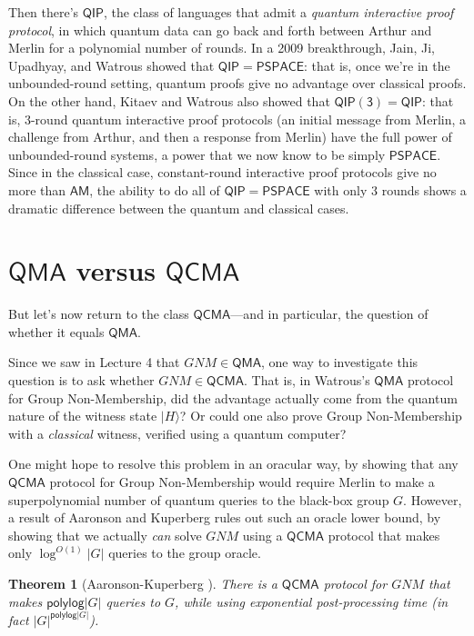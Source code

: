 \documentclass[12pt]{report}
\theoremstyle{plain}
\newtheorem{theorem}{Theorem}[section]
\theoremstyle{definition}
\renewcommand{\ket}[1]{|#1\rangle}
\begin{document}
Then there's $\mathsf{QIP}$, the class of languages that admit a {\em quantum interactive proof protocol}, in which quantum data can go back and forth between Arthur and Merlin for a polynomial number of rounds.  In a 2009 breakthrough, Jain, Ji, Upadhyay, and Watrous \cite{JJUW11} showed that $\mathsf{QIP}=\mathsf{PSPACE}$: that is, once we're in the unbounded-round setting, quantum proofs give no advantage over classical proofs.  On the other hand, Kitaev and Watrous \cite{kitaevwatrous} also showed that $\mathsf{QIP(3)}=\mathsf{QIP}$: that is, 3-round quantum interactive proof protocols (an initial message from Merlin, a challenge from Arthur, and then a response from Merlin) have the full power of unbounded-round systems, a power that we now know to be simply $\mathsf{PSPACE}$.  Since in the classical case, constant-round interactive proof protocols give no more than $\mathsf{AM}$, the ability to do all of $\mathsf{QIP}=\mathsf{PSPACE}$ with only $3$ rounds shows a dramatic difference between the quantum and classical cases.

\section{$\mathsf{QMA}$ versus $\mathsf{QCMA}$}

But let's now return to the class $\mathsf{QCMA}$---and in particular, the question of whether it equals $\mathsf{QMA}$.

Since we saw in Lecture 4 that $GNM \in \mathsf{QMA}$, one way to investigate this question is to ask whether $GNM \in \mathsf{QCMA}$.  That is, in Watrous's $\mathsf{QMA}$ protocol for Group Non-Membership, did the advantage actually come from the quantum nature of the witness state $\ket{H}$?  Or could one also prove Group Non-Membership with a {\em classical} witness, verified using a quantum computer?

One might hope to resolve this problem in an oracular way, by showing that any $\mathsf{QCMA}$ protocol for Group Non-Membership would require Merlin to make a superpolynomial number of quantum queries to the black-box group $G$.  However, a result of Aaronson and Kuperberg \cite{ak} rules out such an oracle lower bound, by showing that we actually {\em can} solve $GNM$ using a $\mathsf{QCMA}$ protocol that makes only $\log^{O(1)} |G|$ queries to the group oracle.

\begin{theorem} [Aaronson-Kuperberg \cite{ak}]
\label{akthm}
There is a $\mathsf{QCMA}$ protocol for $GNM$ that makes
  $\mathsf{polylog}| G |$ queries to $G$, while using exponential post-processing time (in fact  $| G |^{\mathsf{polylog} | G |}$).
\end{theorem}
\end{document}

